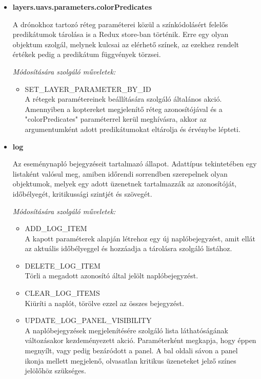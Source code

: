 \begin{itemize}

  \item \textbf{layers.uavs.parameters.colorPredicates}

    A drónokhoz tartozó réteg paraméterei közül a színkódolásért felelős
    predikátumok tárolása is a Redux store-ban történik. Erre egy olyan objektum
    szolgál, melynek kulcsai az elérhető színek, az ezekhez rendelt értékek
    pedig a predikátum függvények törzsei.

    \textit{Módosítására szolgáló műveletek:}

    \begin{itemize}
      \item SET\_LAYER\_PARAMETER\_BY\_ID \\
        A rétegek paramétereinek beállítására szolgáló általános akció.
        Amennyiben a koptereket megjelenítő réteg azonosítójával és a
        "colorPredicates" paraméterrel kerül meghívásra, akkor az argumentumként
        adott predikátumokat eltárolja és érvénybe lépteti.
    \end{itemize}

  \item \textbf{log}

    Az eseménynapló bejegyzéseit tartalmazó állapot. Adattípus tekintetében egy
    listaként valósul meg, amiben időrendi sorrendben szerepelnek olyan
    objektumok, melyek egy adott üzenetnek tartalmazzák az azonosítóját,
    időbélyegét, kritikussági szintjét és szövegét.

    \textit{Módosítására szolgáló műveletek:}

    \begin{itemize}
      \item ADD\_LOG\_ITEM \\
        A kapott paraméterek alapján létrehoz egy új naplóbejegyzést, amit ellát
        az aktuális időbélyeggel és hozzáadja a tárolásra szolgáló listához.

      \item DELETE\_LOG\_ITEM \\
        Törli a megadott azonosító által jelölt naplóbejegyzést.

      \item CLEAR\_LOG\_ITEMS \\
        Kiüríti a naplót, törölve ezzel az összes bejegyzést.

      \item UPDATE\_LOG\_PANEL\_VISIBILITY \\
        A naplóbejegyzések megjelenítésére szolgáló lista láthatóságának
        változásakor kezdeményezett akció. Paraméterként megkapja, hogy éppen
        megnyílt, vagy pedig bezáródott a panel.
        A bal oldali sávon a panel ikonja mellett megjelenő, olvasatlan kritikus
        üzeneteket jelző színes jelölőhöz szükséges.


\end{itemize}
\end{itemize}
